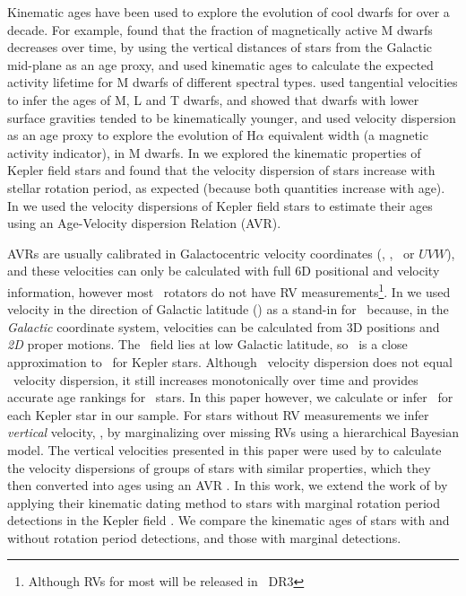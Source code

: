 Kinematic ages have been used to explore the evolution of cool dwarfs for over
a decade.
For example, \citet{west2004, west2006} found that the fraction of
magnetically active M dwarfs decreases over time, by using the vertical
distances of stars from the Galactic mid-plane as an age proxy, and
\citet{west2008} used kinematic ages to calculate the expected activity
lifetime for M dwarfs of different spectral types.
\citet{faherty2009} used tangential velocities to infer the ages of M, L and T
dwarfs, and showed that dwarfs with lower surface gravities tended to be
kinematically younger, and \citet{kiman2019} used velocity dispersion as an
age proxy to explore the evolution of H$\alpha$ equivalent width (a magnetic
activity indicator), in M dwarfs.
In \citet{angus2020} we explored the kinematic properties of Kepler field
stars and found that the velocity dispersion of stars increase with stellar
rotation period, as expected (because both quantities increase with age).
In \citet{lu2021} we used the velocity dispersions of Kepler field stars to
estimate their ages using an Age-Velocity dispersion Relation (AVR).

AVRs are usually calibrated in Galactocentric velocity coordinates (\vx, \vy,
\vz\ or $UVW$), and these velocities can only be calculated with full 6D
positional and velocity information, however most \kepler\ rotators do not
have RV measurements\footnote{Although RVs for most will be released in \gaia\
DR3}.
In \citep{angus2020} we used velocity in the direction of Galactic latitude
(\vb) as a stand-in for \vz\ because, in the {\it Galactic} coordinate system,
velocities can be calculated from 3D positions and {\it 2D} proper motions.
The \kepler\ field lies at low Galactic latitude, so \vb\ is a close
approximation to \vz\ for Kepler stars.
Although \vb\ velocity dispersion does not equal \vz\ velocity dispersion, it
still increases monotonically over time and provides accurate age rankings for
\kepler\ stars.
In this paper however, we calculate or infer \vz\ for each Kepler star in our
sample.
For stars without RV measurements we infer {\it vertical} velocity, \vz, by
marginalizing over missing RVs using a hierarchical Bayesian model.
The vertical velocities presented in this paper were used by \citet{lu2021} to
calculate the velocity dispersions of groups of stars with similar properties,
which they then converted into ages using an AVR \citep{yu2018}.
In this work, we extend the work of \citet{lu2021} by applying their kinematic
dating method to stars with marginal rotation period detections in the Kepler
field \citep{mcquillan2014}.
We compare the kinematic ages of stars with and without rotation period
detections, and those with marginal detections.

